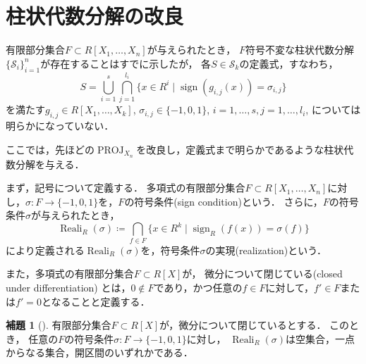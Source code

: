 \documentclass[uplatex, dvipdfmx]{jsarticle}
\numberwithin{equation}{section}
\newcommand{\map}[3]{{#1}\colon{#2}\rightarrow{#3}}
\DeclareMathOperator{\PROJ}{PROJ}
\DeclareMathOperator{\Reali}{Reali}
\DeclareMathOperator{\sign}{sign}
\theoremstyle{definition}
\newtheorem{lemma}[definition]{補題}
\begin{document}
\section{柱状代数分解の改良}\label{section:7}
有限部分集合$F \subset R[X_1, \dots, X_n]$が与えられたとき，
$F$符号不変な柱状代数分解$\{\mathcal{S}_i\}_{i=1}^n$が存在することはすでに示したが，
各$S \in \mathcal{S}_k$の定義式，すなわち，
\begin{equation}
     S = \bigcup_{i=1}^s \bigcap_{j=1}^{l_i} \{x \in R^i \mid \sign(g_{i,j}(x)) = \sigma_{i,j}\}
\end{equation}
を満たす$g_{i,j} \in R[X_1, \dots, X_k]$, $\sigma_{i,j} \in \{-1, 0, 1\}$, $i=1, \dots, s, j=1, \dots, l_i$, については明らかになっていない．

ここでは，先ほどの$\PROJ_{X_n}$を改良し，定義式まで明らかであるような柱状代数分解を与える．

まず，記号について定義する．
多項式の有限部分集合$F \subset R[X_1, \dots, X_n]$に対し，$\map{\sigma}{F}{\{-1,0,1\}}$を，$F$の符号条件(sign condition)という．
さらに，$F$の符号条件$\sigma$が与えられたとき，
\begin{equation}
     \Reali_R(\sigma)\coloneqq \bigcap_{f \in F}\{x \in R^k \mid \sign_R(f(x)) = \sigma(f)\}
\end{equation}
により定義される$\Reali_R(\sigma)$を，符号条件$\sigma$の実現(realization)という．

また，多項式の有限部分集合$F \subset R[X]$が，
微分について閉じている(closed under differentiation)
とは，$0 \not \in F$であり，かつ任意の$f \in F$に対して，$f' \in F$または$f'=0$となることと定義する．

\begin{lemma}[{\cite[Lemma 5.33]{MR2248869}}]\label{lemma:Thom}
     有限部分集合$F \subset R[X]$が，微分について閉じているとする．
     このとき， 任意の$F$の符号条件$\map{\sigma}{F}{\{-1,0,1\}}$に対し，
     $\Reali_R(\sigma)$は空集合，一点からなる集合，開区間のいずれかである．
\end{lemma}
\end{document}
